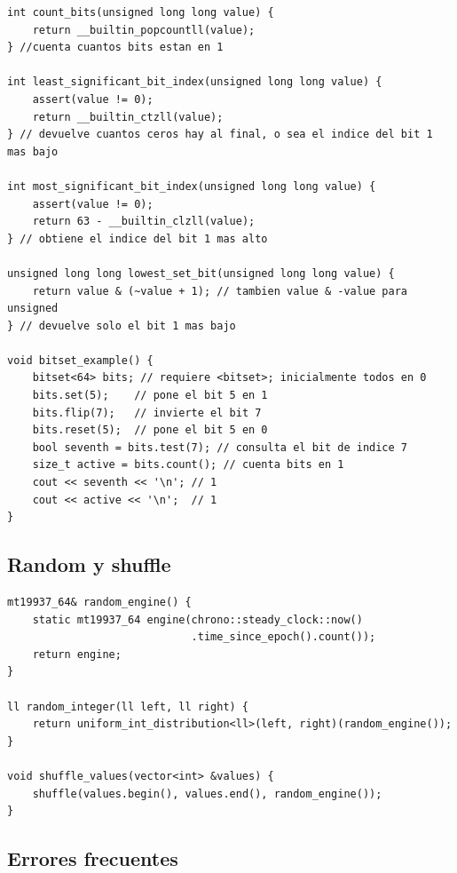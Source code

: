 \begin{lstlisting}[style=cpp]
int count_bits(unsigned long long value) {
    return __builtin_popcountll(value);
} //cuenta cuantos bits estan en 1

int least_significant_bit_index(unsigned long long value) {
    assert(value != 0);
    return __builtin_ctzll(value);
} // devuelve cuantos ceros hay al final, o sea el indice del bit 1 mas bajo

int most_significant_bit_index(unsigned long long value) {
    assert(value != 0);
    return 63 - __builtin_clzll(value);
} // obtiene el indice del bit 1 mas alto

unsigned long long lowest_set_bit(unsigned long long value) {
    return value & (~value + 1); // tambien value & -value para unsigned
} // devuelve solo el bit 1 mas bajo

void bitset_example() {
    bitset<64> bits; // requiere <bitset>; inicialmente todos en 0
    bits.set(5);    // pone el bit 5 en 1
    bits.flip(7);   // invierte el bit 7
    bits.reset(5);  // pone el bit 5 en 0
    bool seventh = bits.test(7); // consulta el bit de indice 7
    size_t active = bits.count(); // cuenta bits en 1
    cout << seventh << '\n'; // 1
    cout << active << '\n';  // 1
}
\end{lstlisting}


\subsection{Random y shuffle}

\begin{lstlisting}[style=cpp]
mt19937_64& random_engine() {
    static mt19937_64 engine(chrono::steady_clock::now()
                             .time_since_epoch().count());
    return engine;
}

ll random_integer(ll left, ll right) {
    return uniform_int_distribution<ll>(left, right)(random_engine());
}

void shuffle_values(vector<int> &values) {
    shuffle(values.begin(), values.end(), random_engine());
}
\end{lstlisting}

\subsection{Errores frecuentes}

